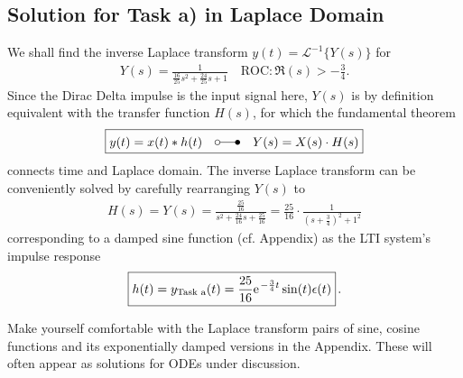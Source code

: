 \documentclass[a4paper,11pt,oneside]{scrartcl}
\begin{document}
\subsection{Solution for Task a) in Laplace Domain}
\label{sec:TransferFunction}
We shall find the inverse Laplace transform
$y(t) = \mathcal{L}^{-1}\{Y(s)\}$ for
\begin{align}
Y(s) = \frac{1}{\frac{16}{25} s^2 + \frac{24}{25} s + 1}
\quad \text{ROC}: \Re(s) > -\frac{3}{4}.
\end{align}
Since the Dirac Delta impulse is the input signal here,
$Y(s)$ is by definition equivalent with the
transfer function $H(s)$, for which the fundamental theorem
\begin{align}
\boxed{y(t) = x(t)*h(t) \quad \laplace \quad Y(s) = X(s) \cdot H(s)}
\end{align}
connects time and Laplace domain.
%
The inverse Laplace transform can be conveniently solved by carefully
rearranging
$Y(s)$ to
\begin{align}
H(s) = Y(s) = \frac{\frac{25}{16}}{s^2 + \frac{24}{16} s + \frac{25}{16}}=
\frac{25}{16} \cdot \frac{1}{(s + \frac{3}{4})^2 + 1^2}
\end{align}
corresponding to a damped sine function (cf. Appendix) as the LTI system's
impulse response
\begin{align}
\boxed{h(t) = y_\text{Task a}(t) = \frac{25}{16} \e^{-\frac{3}{4} t} \sin(t)
\epsilon(t)}\,.
\end{align}

Make yourself comfortable with the Laplace transform pairs of sine, cosine
functions and its exponentially damped versions in the Appendix.
These will often appear as solutions for ODEs under discussion.


\end{document}
